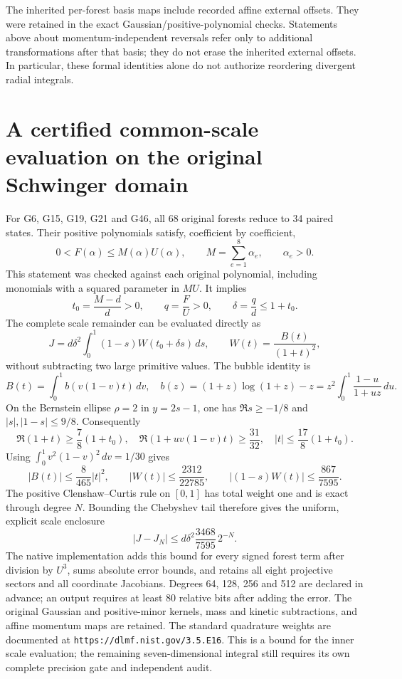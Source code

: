 \documentclass[11pt]{article}
\begin{document}
The inherited per-forest basis maps include recorded affine external
offsets. They were retained in the exact Gaussian/positive-polynomial
checks. Statements above about momentum-independent reversals refer
only to additional transformations after that basis; they do not
erase the inherited external offsets. In particular, these formal
identities alone do not authorize reordering divergent radial integrals.
\section*{A certified common-scale evaluation on the original Schwinger domain}
For G6, G15, G19, G21 and G46, all 68 original forests reduce to 34 paired
states. Their positive polynomials satisfy, coefficient by coefficient,
\[
 0<F(\alpha)\leq M(\alpha)U(\alpha),\qquad
 M=\sum_{e=1}^{8}\alpha_e,\qquad \alpha_e>0.
\]
This statement was checked against each original polynomial, including
monomials with a squared parameter in $MU$. It implies
\[
 t_0=\frac{M-d}{d}>0,\qquad q=\frac FU>0,\qquad
 \delta=\frac qd\leq1+t_0.
\]
The complete scale remainder can be evaluated directly as
\[
 J=d\delta^2\int_0^1(1-s)W(t_0+\delta s)\,ds,
 \qquad W(t)=\frac{B(t)}{(1+t)^2},
\]
without subtracting two large primitive values. The bubble identity is
\[
 B(t)=\int_0^1 b(v(1-v)t)\,dv,\quad
 b(z)=(1+z)\log(1+z)-z
     =z^2\int_0^1\frac{1-u}{1+uz}\,du.
\]
On the Bernstein ellipse $\rho=2$ in $y=2s-1$, one has
$\Re s\geq-1/8$ and $|s|,|1-s|\leq9/8$. Consequently
\[
 \Re(1+t)\geq\frac78(1+t_0),\quad
 \Re(1+uv(1-v)t)\geq\frac{31}{32},\quad
 |t|\leq\frac{17}{8}(1+t_0).
\]
Using $\int_0^1v^2(1-v)^2\,dv=1/30$ gives
\[
 |B(t)|\leq\frac8{465}|t|^2,\qquad
 |W(t)|\leq\frac{2312}{22785},\qquad
 |(1-s)W(t)|\leq\frac{867}{7595}.
\]
The positive Clenshaw--Curtis rule on $[0,1]$ has total weight one and
is exact through degree $N$. Bounding the Chebyshev tail therefore gives
the uniform, explicit scale enclosure
\[
 |J-J_N|\leq d\delta^2\frac{3468}{7595}\,2^{-N}.
\]
The native implementation adds this bound for every signed forest term
after division by $U^3$, sums absolute error bounds, and retains all eight
projective sectors and all coordinate Jacobians. Degrees 64, 128, 256 and
512 are declared in advance; an output requires at least 80 relative
bits after adding the error. The original Gaussian and positive-minor
kernels, mass and kinetic subtractions, and affine momentum maps are retained.
The standard quadrature weights are documented at
\texttt{https://dlmf.nist.gov/3.5.E16}.
This is a bound for the inner scale evaluation; the remaining seven-dimensional
integral still requires its own complete precision gate and independent audit.
\end{document}
